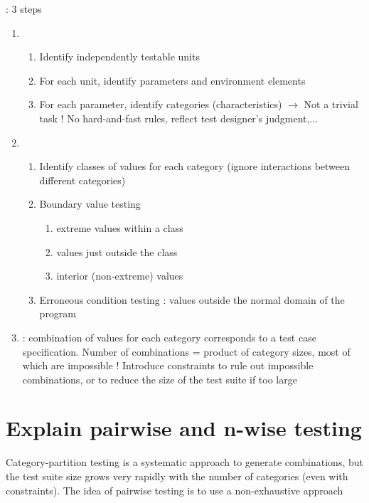  : 3 steps
\begin{enumerate}
    \item {}
    \begin{enumerate}
        \item Identify independently testable units
        \item For each unit, identify parameters and environment elements
        \item For each parameter, identify categories (characteristics) $\rightarrow$ Not a trivial task ! No hard-and-fast rules, reflect test designer’s judgment,...
    \end{enumerate}
    \item {}
    \begin{enumerate}
        \item Identify classes of values for each category (ignore interactions
between different categories)

        \item Boundary value testing
        \begin{enumerate}
            \item extreme values within a class
            \item values just outside the class
            \item interior (non-extreme) values
        \end{enumerate}
        \item Erroneous condition testing : values outside the normal domain of the program
    \end{enumerate}
    \item  {} : combination of values for each category corresponds to a test case specification. Number of combinations = product of category sizes, most of which are impossible ! Introduce constraints to rule out impossible combinations, or to reduce the size of the test suite if too large
\end{enumerate}

\section{Explain pairwise and n-wise testing}

Category-partition testing is a systematic approach to generate combinations, but the test suite size grows very rapidly with the number of categories (even with constraints). The idea of pairwise testing is to use a non-exhaustive approach

